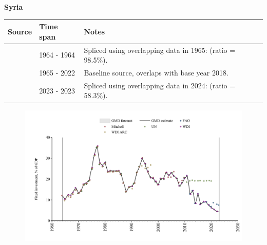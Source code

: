 \documentclass[12pt,a4paper,landscape]{article}
\begin{document}
\begin{adjustbox}{max totalsize={\paperwidth}{\paperheight},center}
\begin{minipage}[t][\textheight][t]{\textwidth}
\vspace*{0.5cm}
{}
\begin{center}
{\Large\bfseries Syria}
\end{center}
\vspace{0.5cm}
\begin{table}[H]
\centering
\small
\begin{tabular}{|l|l|l|}
\hline
\textbf{Source} & \textbf{Time span} & \textbf{Notes} \\
\hline
\rowcolor{white}\cite{Mitchell}& 1964 - 1964 &Spliced using overlapping data in 1965: (ratio = 98.5\%).\\
\rowcolor{lightgray}\cite{WDI}& 1965 - 2022 &Baseline source, overlaps with base year 2018.\\
\rowcolor{white}\cite{FAO}& 2023 - 2023 &Spliced using overlapping data in 2024: (ratio = 58.3\%).\\
\hline
\end{tabular}
\end{table}
\begin{figure}[H]
\centering
\includegraphics[width=\textwidth,height=0.6\textheight,keepaspectratio]{graphs/SYR_finv_GDP.pdf}
\end{figure}
\end{minipage}
\end{adjustbox}
\end{document}
